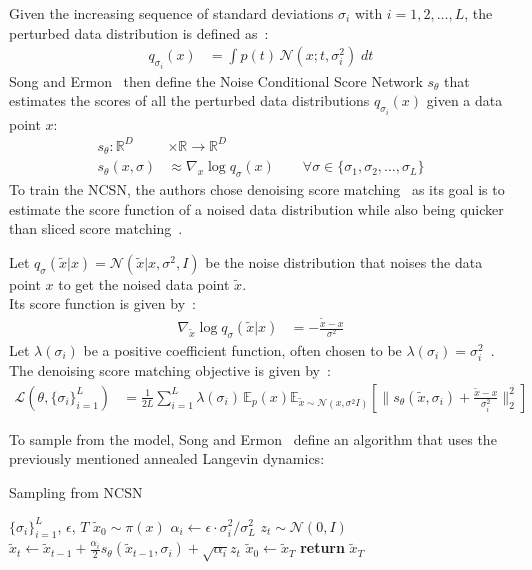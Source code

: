 \documentclass{article}
\numberwithin{equation}{section}
\numberwithin{figure}{section}
\begin{document}
Given the increasing sequence of standard deviations $\sigma_i$ with $i = 1, 2, \ldots, L$, the perturbed data distribution is defined as~\cite{song2020generative}:
\begin{align}
  q_{\sigma_i}(x) &= \int p(t) \, \mathcal{N}(x; t, \sigma_i^2) \; dt
\end{align}
Song and Ermon~\cite{song2020generative} then define the Noise Conditional Score Network $s_\theta$ that estimates the scores of all the perturbed data distributions $q_{\sigma_i}(x)$ given a data point $x$:
\begin{align}
  s_\theta : \mathbb{R}^D &\times \mathbb{R} \rightarrow \mathbb{R}^D \\
  s_\theta (x, \sigma) &\approx \nabla_x \log q_\sigma (x) \qquad \forall \sigma \in \{ \sigma_1, \sigma_2, \ldots, \sigma_L \}
\end{align}
To train the NCSN, the authors chose denoising score matching~\cite{vincent2010denoising} as its goal is to estimate the score function of a noised data distribution while also being quicker than sliced score matching~\cite{song2020generative, song2019sliced}.

Let $q_\sigma (\tilde{x} | x) = \mathcal{N}(\tilde{x} | x, \sigma^2, I)$ be the noise distribution that noises the data point $x$ to get the noised data point $\tilde{x}$. \\
Its score function is given by~\cite{song2020generative}:
\begin{align}
  \nabla_{\tilde{x}} \log q_\sigma (\tilde{x} | x) &= - \frac{\tilde{x} - x}{\sigma^2} 
\end{align}
Let $\lambda (\sigma_i)$ be a positive coefficient function, often chosen to be $\lambda (\sigma_i) = \sigma_i^2$~\cite{songblog, song2020generative}. \\
The denoising score matching objective is given by~\cite{song2020generative}:
\begin{align}
  \mathcal{L}(\theta, \{ \sigma_i \}_{i=1}^L) &= \frac{1}{2L} \sum^L_{i=1} \lambda(\sigma_i) \, \mathbb{E}_p(x) \mathbb{E}_{\tilde{x} \sim \mathcal{N}(x, \sigma^2 I)} \left[ \| s_\theta (\tilde{x}, \sigma_i) + \frac{\tilde{x} - x}{\sigma_i^2} \|_2^2 \right]
\end{align}

To sample from the model, Song and Ermon~\cite{song2020generative} define an algorithm that uses the previously mentioned annealed Langevin dynamics:
\begin{algorithm}[H]
  \centering
  \caption{Sampling from NCSN}\label{alg:ncsn}
  \begin{algorithmic}[1]
    \Require $\{\sigma_i\}_{i=1}^L$, $\epsilon$, $T$ 
    \State $\tilde{x}_0 \sim \pi(x)$
      \State $\alpha_i \leftarrow \epsilon \cdot \sigma_i^2 / \sigma_L^2$
        \State $z_t \sim \mathcal{N}(0, I)$
        \State $\tilde{x}_t \leftarrow \tilde{x}_{t-1} + \frac{\alpha_i}{2} s_\theta (\tilde{x}_{t-1}, \sigma_i) + \sqrt{\alpha_i} z_t$
      \EndFor
      \State $\tilde{x}_0 \leftarrow \tilde{x}_T$
    \EndFor
    \State \textbf{return} $\tilde{x}_T$
  \end{algorithmic}
\end{algorithm}
\end{document}
